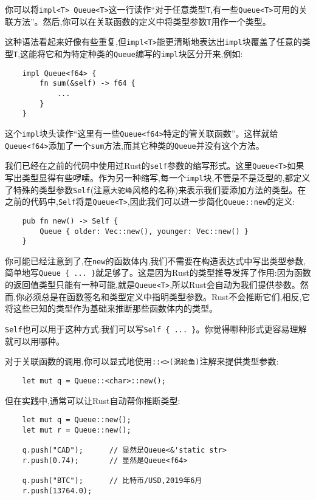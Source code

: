你可以将\texttt{impl<T> Queue<T>}这一行读作“对于任意类型\texttt{T},有一些\texttt{Queue<T>}可用的关联方法”。然后,你可以在关联函数的定义中将类型参数\texttt{T}用作一个类型。

这种语法看起来好像有些重复,但\texttt{impl<T>}能更清晰地表达出\texttt{impl}块覆盖了任意的类型\texttt{T},这能将它和为特定种类的\texttt{Queue}编写的\texttt{impl}块区分开来,例如:
\begin{verbatim}
    impl Queue<f64> {
        fn sum(&self) -> f64 {
            ...
        }
    }
\end{verbatim}

这个\texttt{impl}块头读作“这里有一些\texttt{Queue<f64>}特定的管关联函数”。这样就给\texttt{Queue<f64>}添加了一个\texttt{sum}方法,而其它种类的\texttt{Queue}并没有这个方法。

我们已经在之前的代码中使用过Rust的\texttt{self}参数的缩写形式。这里\texttt{Queue<T>}如果写出类型显得有些啰嗦。作为另一种缩写,每一个\texttt{impl}块,不管是不是泛型的,都定义了特殊的类型参数\texttt{Self}(注意\texttt{大驼峰}风格的名称)来表示我们要添加方法的类型。在之前的代码中,\texttt{Self}将是\texttt{Queue<T>},因此我们可以进一步简化\texttt{Queue::new}的定义:
\begin{verbatim}
    pub fn new() -> Self {
        Queue { older: Vec::new(), younger: Vec::new() }
    }
\end{verbatim}

你可能已经注意到了,在\texttt{new}的函数体内,我们不需要在构造表达式中写出类型参数,简单地写\texttt{Queue \{ ... \}}就足够了。这是因为Rust的类型推导发挥了作用:因为函数的返回值类型只能有一种可能,就是\texttt{Queue<T>},所以Rust会自动为我们提供参数。然而,你必须总是在函数签名和类型定义中指明类型参数。Rust不会推断它们,相反,它将这些已知的类型作为基础来推断那些函数体内的类型。

\texttt{Self}也可以用于这种方式:我们可以写\texttt{Self \{ ... \}}。你觉得哪种形式更容易理解就可以用哪种。

对于关联函数的调用,你可以显式地使用\texttt{::<>(涡轮鱼)}注解来提供类型参数:
\begin{verbatim}
    let mut q = Queue::<char>::new();
\end{verbatim}

但在实践中,通常可以让Rust自动帮你推断类型:
\begin{verbatim}
    let mut q = Queue::new();
    let mut r = Queue::new();

    q.push("CAD");      // 显然是Queue<&'static str>
    r.push(0.74);       // 显然是Queue<f64>

    q.push("BTC");      // 比特币/USD,2019年6月 
    r.push(13764.0);    
\end{verbatim}

